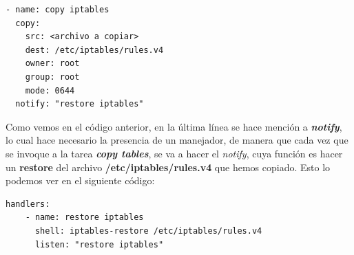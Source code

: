 \documentclass[11pt]{article}
\begin{document}
\begin{lstlisting}[style=C,numbers=none]
- name: copy iptables
  copy:
    src: <archivo a copiar>
    dest: /etc/iptables/rules.v4
    owner: root
    group: root
    mode: 0644
  notify: "restore iptables"
\end{lstlisting}

Como vemos en el código anterior, en la última línea se hace mención a \textbf{\textit{notify}}, lo cual hace necesario la presencia de un manejador, de manera que cada vez que se invoque a la tarea \textbf{\textit{copy tables}}, se va a hacer el \textit{notify}, cuya función es hacer un \textbf{restore} del archivo \textbf{/etc/iptables/rules.v4} que hemos copiado. Esto lo podemos ver en el siguiente código:

\begin{lstlisting}[style=C,numbers=none]
handlers:
    - name: restore iptables
      shell: iptables-restore /etc/iptables/rules.v4
      listen: "restore iptables"
\end{lstlisting}

\newpage
\end{document}
